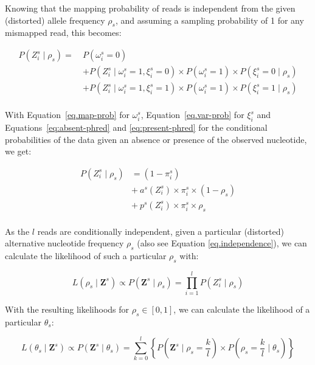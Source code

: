 \documentclass[authoryear,preprint,11pt]{scrartcl}
\newcommand{\Prob}{{P}}
\begin{document}
Knowing that the mapping probability of reads is independent from the given (distorted) allele frequency $\rho_s$, and assuming a sampling probability of 1 for any mismapped read, this becomes:

\begin{equation}
 \begin{split}
  \Prob(Z_i^s \mid \rho_s) =~ &\Prob(\omega_i^s=0) \\
  &+ \Prob(Z_i^s \mid \omega_i^s=1,\xi_i^s=0) \times \Prob(\omega_i^s=1) \times \Prob(\xi_i^s=0 \mid \rho_s) \\
  &+ \Prob(Z_i^s \mid \omega_i^s=1,\xi_i^s=1) \times \Prob(\omega_i^s=1) \times \Prob(\xi_i^s=1 \mid \rho_s) \\
 \end{split}
\end{equation}

With Equation~\ref{eq.map-prob} for $\omega_i^s$, Equation~\ref{eq.var-prob} for $\xi_i^s$ and Equations~\ref{eq:absent-phred} and \ref{eq:present-phred} for the conditional probabilities of the data given an absence or presence of the observed nucleotide, we get:

\begin{equation}
 \label{eq:read_probability}
 \begin{split}
  \Prob(Z_i^s \mid \rho_s) &= (1 - \pi_i^s) \\
  &+~ a^s(Z_i^s)\times \pi_i^s \times (1 - \rho_s) \\
  &+~ p^s(Z_i^s) \times \pi_i^s \times \rho_s \\
 \end{split}
\end{equation}

As the $l$ reads are conditionally independent, given a particular (distorted) alternative nucleotide frequency $\rho_s$ (also see Equation \ref{eq.independence}), we can calculate the likelihood of such a particular $\rho_s$ with:

\begin{equation}
 \label{eq:read-product}
 L(\rho_s \mid\boldsymbol{Z}^s) \propto \Prob(\boldsymbol{Z}^s \mid \rho_s) = \prod_{i=1}^l \Prob(Z_i^s \mid \rho_s)
\end{equation}

With the resulting likelihoods for $\rho_s \in [0,1]$, we can calculate the likelihood of a particular $\theta_s$:

\begin{equation}
 \label{eq:theta-likelihood}
 L(\theta_s \mid\boldsymbol{Z}^s) \propto \Prob(\boldsymbol{Z}^s \mid \theta_s) = \sum_{k=0}^{l} \left\{ \Prob(\boldsymbol{Z}^s \mid \rho_s = \frac{k}{l}) \times \Prob(\rho_s = \frac{k}{l} \mid \theta_s) \right\}
\end{equation}
\end{document}
